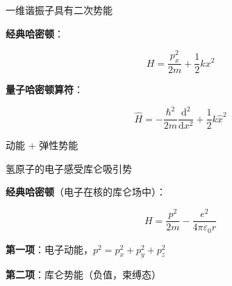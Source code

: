 \begin{frame}{一维谐振子具有二次势能}

  
    \begin{iqbitemize}
    \item \textbf{经典哈密顿}：
    \end{iqbitemize}
    \[
      H = \dfrac{p_x^2}{2m} + \dfrac{1}{2}kx^2
    \]
    \begin{iqbitemize}
    \item \textbf{量子哈密顿算符}：
    \end{iqbitemize}
    \[
      \hat{H} = -\dfrac{\hbar^2}{2m}\dfrac{\mathrm{d}^2}{\mathrm{d}x^2} + \dfrac{1}{2}k\hat{x}^2
    \]
    \begin{iqbitemize}
    \item 动能 + 弹性势能
    \end{iqbitemize}

  
\end{frame}

\begin{frame}{氢原子的电子感受库仑吸引势}

  
    \begin{iqbitemize}
    \item \textbf{经典哈密顿}（电子在核的库仑场中）：
    \end{iqbitemize}
    \[
      H = \dfrac{p^2}{2m} - \dfrac{e^2}{4\pi\varepsilon_0 r}
    \]
    \begin{iqbitemize}
    \item \textbf{第一项}：电子动能，$p^2 = p_x^2 + p_y^2 + p_z^2$
    \item \textbf{第二项}：库仑势能（负值，束缚态）
    \end{iqbitemize}

    \iqbsmallsep

    \end{frame}


